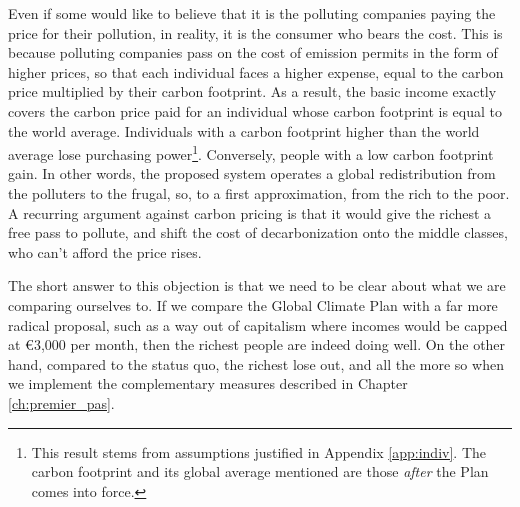 \documentclass[a5paper,english,openany]{memoir}
\begin{document}
Even if some would like to believe that it is the polluting companies paying the price for their pollution, in reality, it is the consumer who bears the cost. %
This is because polluting companies pass on the cost of emission permits in the form of higher prices, so that each individual faces a higher expense, equal to the carbon price multiplied by their %
carbon footprint. As a result, the basic income exactly covers the carbon price paid for an individual whose carbon footprint is equal to the world average. Individuals with a carbon footprint higher than the world average lose purchasing power\footnote{This result stems from assumptions justified in Appendix \ref{app:indiv}. The carbon footprint and its global average mentioned are those \textit{after} the Plan comes into force.
}. Conversely, people with a low carbon footprint gain. In other words, the proposed system operates a global redistribution from the polluters to the frugal, %
so, to a first approximation, from the rich to the poor. 
A recurring argument against carbon pricing is that it would give the richest a free pass to pollute, and shift the cost of decarbonization onto the middle classes, who can't %
afford the price rises. 

The short answer to this objection is that we need to be clear about what we are %
comparing ourselves to. If we compare the Global Climate Plan with a far more radical proposal, such as a way out of capitalism where incomes would be capped at \euro{}3,000 per month, then the richest people are indeed doing well. On the other hand, compared to the status quo, the richest lose out, and all the more so when we implement the complementary measures described in Chapter \ref{ch:premier_pas}. %
\end{document}
